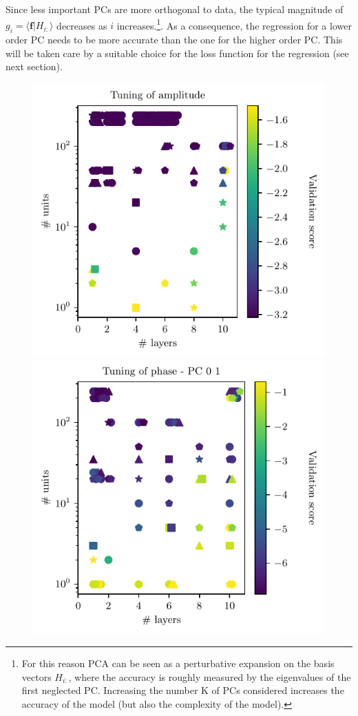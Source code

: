 \documentclass[twocolumn,showpacs,preprintnumbers,nofootinbib,prd,
superscriptaddress,10pt]{revtex4-1}
\begin{document}
Since less important PCs are more orthogonal to data, the typical magnitude of $g_i = \langle \mathbf{f} | H_{i:} \rangle$ decreases as $i$ increases.\footnote{For this reason PCA can be seen as a perturbative expansion on the basis vectors $H_{i:}$, where the accuracy is roughly measured by the eigenvalues of the first neglected PC. Increasing the number K of PCs considered increases the accuracy of the model (but also the complexity of the model).}.
As a consequence, the regression for a lower order PC needs to be more accurate than the one for the higher order PC. This will be taken care by a suitable choice for the loss function for the regression (see next section).

\begin{figure}[t]
	\begin{multicols}
		\centering
		\includegraphics[scale = 0.9]{tuning_amp}\hfill
		\includegraphics[scale = 0.9]{tuning_ph_01}

\end{multicols}
\end{figure}
\end{document}
